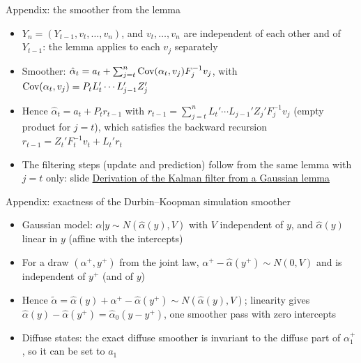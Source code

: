 \begin{frame}{Appendix: the smoother from the lemma}
\hypertarget{atsapp1}{}
\itemsize{\small}
\begin{itemize}
    \item $Y_n = (Y_{t-1}, v_t, \dots, v_n)$, and $v_t, \dots, v_n$ are independent of each other and of $Y_{t-1}$: the lemma applies to each $v_j$ separately
    \item Smoother: $\hat\alpha_t = a_t + \sum_{j=t}^n\text{Cov}(\alpha_t, v_j)F_j^{-1}v_j$, with $\text{Cov}(\alpha_t, v_j) = P_tL_t'\cdots L_{j-1}'Z_j'$
    \item Hence $\hat\alpha_t = a_t + P_tr_{t-1}$ with $r_{t-1} = \sum_{j=t}^nL_t'\cdots L_{j-1}'Z_j'F_j^{-1}v_j$ (empty product for $j = t$), which satisfies the backward recursion $r_{t-1} = Z_t'F_t^{-1}v_t + L_t'r_t$
    \item The filtering steps (update and prediction) follow from the same lemma with $j = t$ only: slide \hyperlink{kflemma}{\textcolor{MainBlue}{Derivation of the Kalman filter from a Gaussian lemma}}
\end{itemize}
\end{frame}

\begin{frame}{Appendix: exactness of the Durbin--Koopman simulation smoother}
\hypertarget{atsapp2}{}
\itemsize{\small}
\begin{itemize}
    \item Gaussian model: $\alpha | y \sim N(\hat\alpha(y), V)$ with $V$ independent of $y$, and $\hat\alpha(y)$ linear in $y$ (affine with the intercepts)
    \item For a draw $(\alpha^+, y^+)$ from the joint law, $\alpha^+ - \hat\alpha(y^+) \sim N(0, V)$ and is independent of $y^+$ (and of $y$)
    \item Hence $\tilde\alpha = \hat\alpha(y) + \alpha^+ - \hat\alpha(y^+) \sim N(\hat\alpha(y), V)$; linearity gives $\hat\alpha(y) - \hat\alpha(y^+) = \hat\alpha_0(y - y^+)$, one smoother pass with zero intercepts
    \item Diffuse states: the exact diffuse smoother is invariant to the diffuse part of $\alpha_1^+$, so it can be set to $a_1$
\end{itemize}
\end{frame}


